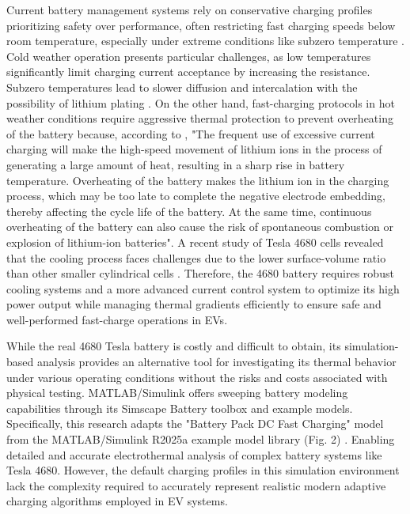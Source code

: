 \documentclass[conference]{IEEEtran}
\begin{document}
Current battery management systems rely on conservative charging profiles prioritizing safety over performance, often restricting fast charging speeds below room temperature, especially under extreme conditions like subzero temperature \cite{RAHMANI2025235827}. Cold weather operation presents particular challenges, as low temperatures significantly limit charging current acceptance by increasing the resistance. Subzero temperatures lead to slower diffusion and intercalation with the possibility of lithium plating \cite{TOMASZEWSKA2019100011}. On the other hand, fast-charging protocols in hot weather conditions require aggressive thermal protection to prevent overheating of the battery because, according to \cite{dai2023research}, "The frequent use of excessive current charging will make the high-speed movement of lithium ions in the process of generating a large amount of heat, resulting in a sharp rise in battery temperature. Overheating of the battery makes the lithium ion in the charging process, which may be too late to complete the negative electrode embedding, thereby affecting the cycle life of the battery. At the same time, continuous overheating of the battery can also cause the risk of spontaneous combustion or explosion of lithium-ion batteries". A recent study of Tesla 4680 cells revealed that the cooling process faces challenges due to the lower surface-volume ratio than other smaller cylindrical cells \cite{ank2023lithium}. Therefore, the 4680 battery requires robust cooling systems and a more advanced current control system to optimize its high power output while managing thermal gradients efficiently to ensure safe and well-performed fast-charge operations in EVs. 

While the real 4680 Tesla battery is costly and difficult to obtain, its simulation-based analysis provides an alternative tool for investigating its thermal behavior under various operating conditions without the risks and costs associated with physical testing. MATLAB/Simulink offers sweeping battery modeling capabilities through its Simscape Battery toolbox and example models. Specifically, this research adapts the "Battery Pack DC Fast Charging" model from the MATLAB/Simulink R2025a example model library (Fig. 2) \cite{mathworks_lithium_pack}. Enabling detailed and accurate electrothermal analysis of complex battery systems like Tesla 4680. However, the default charging profiles in this simulation environment lack the complexity required to accurately represent realistic modern adaptive charging algorithms employed in EV systems.
\end{document}

